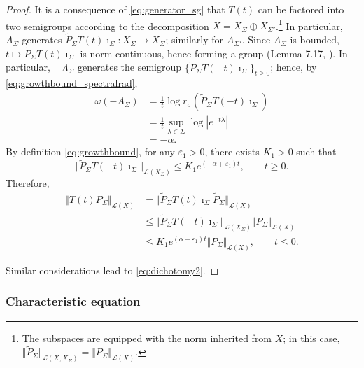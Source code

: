 \documentclass[a4paper, 12pt, oneside, reqno, notitlepage]{amsart}
\theoremstyle{plain}
\theoremstyle{definition}
\theoremstyle{remark}
\begin{document}
 \begin{proof} 
    It is a consequence of \eqref{eq:generator_sg} that $T(t)$ can be factored into two semigroups according to the decomposition $X = X_\Sigma \oplus X_{\Sigma'}$.\footnote{The subspaces are equipped with the norm inherited from $X$; in this case, $\Vert\widetilde{P}_\Sigma \Vert_{\mathcal{L}(X,X_\Sigma)} = \Vert{P}_\Sigma \Vert_{\mathcal{L}(X)}$.}
    In particular, $A_\Sigma$ generates $\widetilde{P}_\Sigma T(t) \imath_\Sigma : X_\Sigma \to X_\Sigma$; similarly for $A_{\Sigma'}$.
    Since $A_\Sigma$ is bounded, $t \mapsto  \widetilde{P}_\Sigma T(t) \imath_\Sigma$ is norm continuous, hence forming a group (Lemma 7.17, \cite{buhler2018functional}). 
    In particular, $-A_\Sigma$ generates the semigroup $\{ \widetilde{P}_\Sigma T(-t) \imath_\Sigma \}_{t \geq 0}$; hence, by \eqref{eq:growthbound_spectralrad},
    \begin{align*}
        \omega(-A_\Sigma) &= \frac{1}{t}\log r_\sigma( \widetilde{P}_\Sigma T(-t) \imath_\Sigma )  \\
        &= \frac{1}{t} \sup_{\lambda \in \Sigma} \log \left| e^{-t \lambda} \right| \\
        & = -\alpha.
    \end{align*}
    By definition \eqref{eq:growthbound}, for any $\varepsilon_1>0$, there exists $K_1 > 0$ such that
    \begin{displaymath}
        \Vert \widetilde{P}_\Sigma T(-t) \imath_\Sigma \Vert_{\mathcal{L}(X_\Sigma)} \leq K_1 e^{(-\alpha +\varepsilon_1)t}, \qquad t \geq 0.
    \end{displaymath}
    Therefore,
    \begin{align*}
        \Vert T(t) P_\Sigma \Vert_{\mathcal{L}(X)}  &= \Vert \widetilde{P}_\Sigma T(t) \imath_\Sigma \widetilde{P}_\Sigma \Vert_{\mathcal{L}(X)} \\
        &\leq \Vert \widetilde{P}_\Sigma T(-t) \imath_\Sigma  \Vert_{\mathcal{L}(X_\Sigma)}  \Vert{P}_\Sigma \Vert_{\mathcal{L}(X)} \\
        &\leq K_1 e^{(\alpha-\varepsilon_1) t} \Vert{P}_\Sigma \Vert_{\mathcal{L}(X)}, \qquad t \leq 0.
    \end{align*}

    Similar considerations lead to \eqref{eq:dichotomy2}.
 \end{proof}


 

\subsubsection{Characteristic equation}
\label{sect:characteristiceq}
\end{document}
